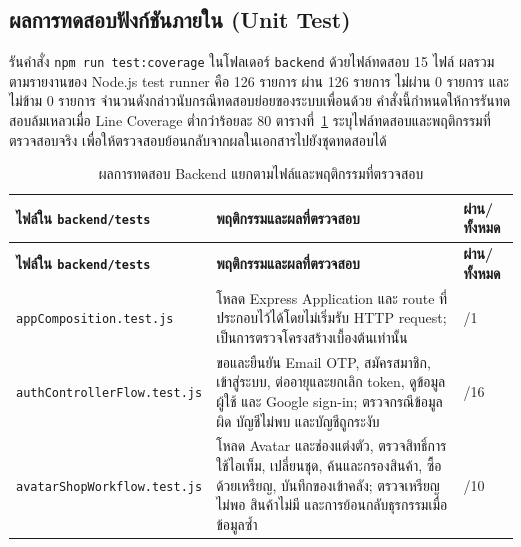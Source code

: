 \subsection{ผลการทดสอบฟังก์ชันภายใน (Unit Test)}

รันคำสั่ง \texttt{npm run test:coverage} ในโฟลเดอร์ \texttt{backend} ด้วยไฟล์ทดสอบ 15 ไฟล์ ผลรวมตามรายงานของ Node.js test runner คือ 126 รายการ ผ่าน 126 รายการ ไม่ผ่าน 0 รายการ และไม่ข้าม 0 รายการ จำนวนดังกล่าวนับกรณีทดสอบย่อยของระบบเพื่อนด้วย คำสั่งนี้กำหนดให้การรันทดสอบล้มเหลวเมื่อ Line Coverage ต่ำกว่าร้อยละ 80 ตารางที่~\ref{tab:backend-unit-results} ระบุไฟล์ทดสอบและพฤติกรรมที่ตรวจสอบจริง เพื่อให้ตรวจสอบย้อนกลับจากผลในเอกสารไปยังชุดทดสอบได้

\begingroup
\footnotesize
\renewcommand{\arraystretch}{1.15}
\KeepTableStart
\begin{longtable}{|>{\raggedright\arraybackslash}p{}|>{\raggedright\arraybackslash}p{}|>{\centering\arraybackslash}p{}|}
\caption{ผลการทดสอบ Backend แยกตามไฟล์และพฤติกรรมที่ตรวจสอบ}\label{tab:backend-unit-results}\\ \hline
\textbf{ไฟล์ใน \texttt{backend/tests}} & \textbf{พฤติกรรมและผลที่ตรวจสอบ} & \textbf{ผ่าน/ทั้งหมด} \\ \hline
\endfirsthead
\hline
\textbf{ไฟล์ใน \texttt{backend/tests}} & \textbf{พฤติกรรมและผลที่ตรวจสอบ} & \textbf{ผ่าน/ทั้งหมด} \\ \hline
\endhead
\texttt{app}\newline\texttt{Composition}\newline\texttt{.test.js} & โหลด Express Application และ route ที่ประกอบไว้ได้โดยไม่เริ่มรับ HTTP request; เป็นการตรวจโครงสร้างเบื้องต้นเท่านั้น & 1/1 \\ \hline
\texttt{auth}\newline\texttt{Controller}\newline\texttt{Flow}\newline\texttt{.test.js} & ขอและยืนยัน Email OTP, สมัครสมาชิก, เข้าสู่ระบบ, ต่ออายุและยกเลิก token, ดูข้อมูลผู้ใช้ และ Google sign-in; ตรวจกรณีข้อมูลผิด บัญชีไม่พบ และบัญชีถูกระงับ & 16/16 \\ \hline
\texttt{avatar}\newline\texttt{ShopWorkflow}\newline\texttt{.test.js} & โหลด Avatar และช่องแต่งตัว, ตรวจสิทธิ์การใช้ไอเท็ม, เปลี่ยนชุด, ค้นและกรองสินค้า, ซื้อด้วยเหรียญ, บันทึกของเข้าคลัง; ตรวจเหรียญไม่พอ สินค้าไม่มี และการย้อนกลับธุรกรรมเมื่อข้อมูลซ้ำ & 10/10 \\ \hline

\end{longtable}
